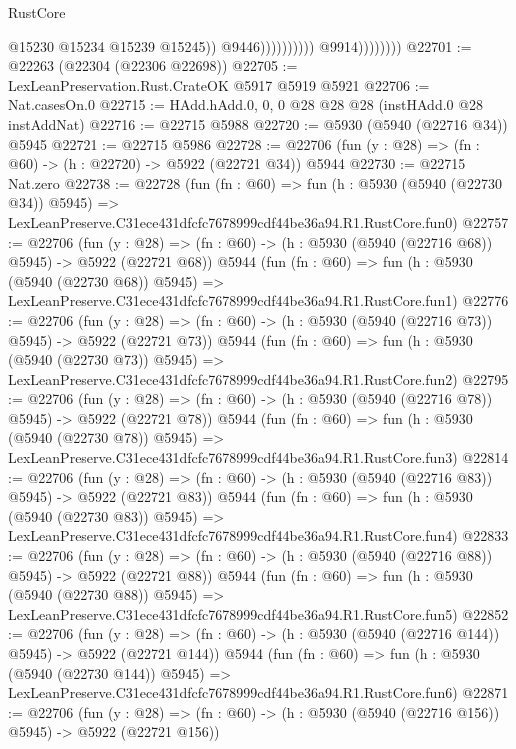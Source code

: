 \begin{lexlean}{RustCore}
\begin{coremodule}
                                            @15230
                                            @15234
                                            @15239
                                            @15245))
                                        @9446))))))))))
                    @9914))))))))
@22701 := @22263 (@22304 (@22306 @22698))
@22705 := LexLeanPreservation.Rust.CrateOK @5917 @5919 @5921
@22706 := Nat.casesOn.{0}
@22715 := HAdd.hAdd.{0, 0, 0} @28 @28 @28 (instHAdd.{0} @28 instAddNat)
@22716 := @22715 @5988
@22720 := @5930 (@5940 (@22716 @34)) @5945
@22721 := @22715 @5986
@22728 := @22706 (fun (y : @28) => (fn : @60) -> (h : @22720) -> @5922 (@22721 @34)) @5944
@22730 := @22715 Nat.zero
@22738 := @22728
    (fun (fn : @60) =>
    fun (h : @5930 (@5940 (@22730 @34)) @5945) =>
    LexLeanPreserve.C31ece431dfcfc7678999cdf44be36a94.R1.RustCore.fun0)
@22757 := @22706
    (fun (y : @28) => (fn : @60) -> (h : @5930 (@5940 (@22716 @68)) @5945) -> @5922 (@22721 @68))
    @5944
    (fun (fn : @60) =>
    fun (h : @5930 (@5940 (@22730 @68)) @5945) =>
    LexLeanPreserve.C31ece431dfcfc7678999cdf44be36a94.R1.RustCore.fun1)
@22776 := @22706
    (fun (y : @28) => (fn : @60) -> (h : @5930 (@5940 (@22716 @73)) @5945) -> @5922 (@22721 @73))
    @5944
    (fun (fn : @60) =>
    fun (h : @5930 (@5940 (@22730 @73)) @5945) =>
    LexLeanPreserve.C31ece431dfcfc7678999cdf44be36a94.R1.RustCore.fun2)
@22795 := @22706
    (fun (y : @28) => (fn : @60) -> (h : @5930 (@5940 (@22716 @78)) @5945) -> @5922 (@22721 @78))
    @5944
    (fun (fn : @60) =>
    fun (h : @5930 (@5940 (@22730 @78)) @5945) =>
    LexLeanPreserve.C31ece431dfcfc7678999cdf44be36a94.R1.RustCore.fun3)
@22814 := @22706
    (fun (y : @28) => (fn : @60) -> (h : @5930 (@5940 (@22716 @83)) @5945) -> @5922 (@22721 @83))
    @5944
    (fun (fn : @60) =>
    fun (h : @5930 (@5940 (@22730 @83)) @5945) =>
    LexLeanPreserve.C31ece431dfcfc7678999cdf44be36a94.R1.RustCore.fun4)
@22833 := @22706
    (fun (y : @28) => (fn : @60) -> (h : @5930 (@5940 (@22716 @88)) @5945) -> @5922 (@22721 @88))
    @5944
    (fun (fn : @60) =>
    fun (h : @5930 (@5940 (@22730 @88)) @5945) =>
    LexLeanPreserve.C31ece431dfcfc7678999cdf44be36a94.R1.RustCore.fun5)
@22852 := @22706
    (fun (y : @28) => (fn : @60) -> (h : @5930 (@5940 (@22716 @144)) @5945) -> @5922 (@22721 @144))
    @5944
    (fun (fn : @60) =>
    fun (h : @5930 (@5940 (@22730 @144)) @5945) =>
    LexLeanPreserve.C31ece431dfcfc7678999cdf44be36a94.R1.RustCore.fun6)
@22871 := @22706
    (fun (y : @28) => (fn : @60) -> (h : @5930 (@5940 (@22716 @156)) @5945) -> @5922 (@22721 @156))

\end{coremodule}
\end{lexlean}
